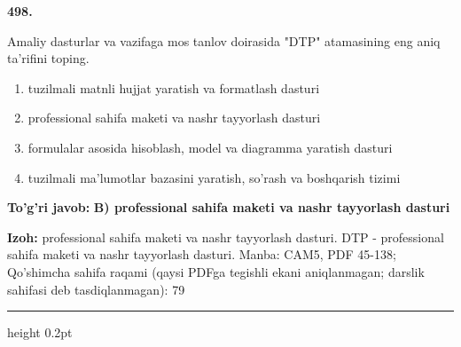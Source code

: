\documentclass[10pt,a4paper]{article}
\begin{document}
{\bfseries\sffamily\color{ink} 498.}
\par
Amaliy dasturlar va vazifaga mos tanlov doirasida "DTP" atamasining eng aniq ta'rifini toping.
\begin{enumerate}[label=\Alph*),leftmargin=9mm]
\item tuzilmali matnli hujjat yaratish va formatlash dasturi
\item professional sahifa maketi va nashr tayyorlash dasturi
\item formulalar asosida hisoblash, model va diagramma yaratish dasturi
\item tuzilmali ma'lumotlar bazasini yaratish, so'rash va boshqarish tizimi
\end{enumerate}
\begin{tcolorbox}[enhanced,breakable,colback=teal!4,colframe=teal!60!black,boxrule=0.45pt,arc=1.2mm,left=2.7mm,right=2.7mm,top=1.8mm,bottom=1.8mm,before skip=2mm,after skip=2mm]
{\bfseries\sffamily\color{teal}To'g'ri javob:} \textbf{B) professional sahifa maketi va nashr tayyorlash dasturi}
\par\smallskip
{\bfseries Izoh:} professional sahifa maketi va nashr tayyorlash dasturi. DTP - professional sahifa maketi va nashr tayyorlash dasturi. Manba: CAM5, PDF 45-138; Qo'shimcha sahifa raqami (qaysi PDFga tegishli ekani aniqlanmagan; darslik sahifasi deb tasdiqlanmagan): 79
\end{tcolorbox}
\vspace{2mm}\hrule height 0.2pt\vspace{3mm}
\end{document}
